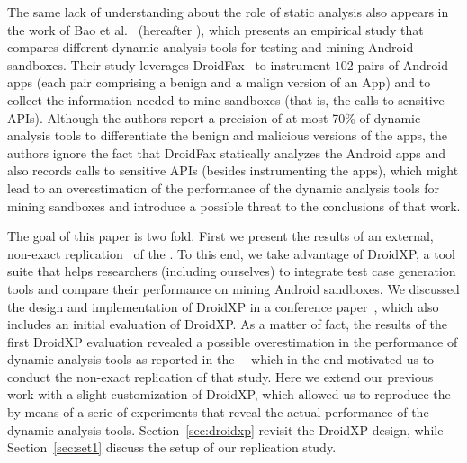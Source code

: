 The same lack of understanding about the role of static analysis also appears in the work of Bao et al.~\cite{DBLP:conf/wcre/BaoLL18} (hereafter \blls), which presents an empirical study that compares different dynamic analysis tools for testing and mining Android sandboxes. Their study leverages DroidFax~\cite{DBLP:conf/icsm/CaiR17a} to instrument $102$ pairs of Android apps (each pair comprising a benign and a malign version of an App) and to collect the information needed to mine sandboxes (that is, the calls to sensitive APIs).
Although the authors report a precision of at most 70\% of dynamic analysis tools to differentiate the benign and malicious versions of the apps, the authors ignore the fact that DroidFax statically analyzes the Android apps and also records calls to sensitive APIs (besides instrumenting the apps), which might lead to an overestimation of the performance of the dynamic analysis tools for mining sandboxes and introduce a possible threat to the conclusions of that work.

The goal of this paper is two fold. First we present the results of an
external, non-exact replication~\cite{role-of-replication} of the \blls. To this end,
we take advantage of DroidXP, a tool suite that helps researchers (including ourselves) to
integrate test case generation tools and compare their performance on
mining Android sandboxes. We discussed the design and implementation of DroidXP in a conference
paper~\cite{DBLP:conf/scam/CostaMCMVBC20}, which also
includes an initial evaluation of DroidXP.
As a matter of fact, the results of the first DroidXP evaluation revealed a possible
overestimation in the performance of dynamic analysis tools as
reported in the \blls---which in the end motivated us to
conduct the non-exact replication of that study. Here we extend
our previous work with a slight customization of DroidXP, which allowed us
to reproduce the \blls by means of a serie of experiments
that reveal the actual performance of the
dynamic analysis tools. Section~\ref{sec:droidxp} revisit the
DroidXP design, while Section~\ref{sec:set1} discuss
the setup of our replication study.




